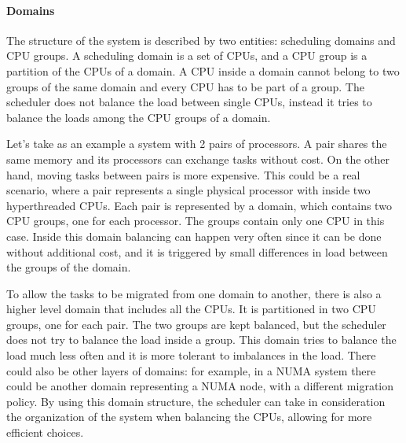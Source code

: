 \paragraph{Domains} %
The structure of the system is described by two entities: scheduling domains and CPU groups. A scheduling domain is a set of CPUs, and a CPU group is a partition of the CPUs of a domain. A CPU inside a domain cannot belong to two groups of the same domain and every CPU has to be part of a group. The scheduler does not balance the load between single CPUs, instead it tries to balance the loads among the CPU groups of a domain.

Let's take as an example a system with 2 pairs of processors. A pair shares the same memory and its processors can exchange tasks without cost. On the other hand, moving tasks between pairs is more expensive. This could be a real scenario, where a pair represents a single physical processor with inside two hyperthreaded CPUs. Each pair is represented by a domain, which contains two CPU groups, one for each processor. The groups contain only one CPU in this case. Inside this domain balancing can happen very often since it can be done without additional cost, and it is triggered by small differences in load between the groups of the domain.

To allow the tasks to be migrated from one domain to another, there is also a higher level domain that includes all the CPUs. It is partitioned in two CPU groups, one for each pair. The two groups are kept balanced, but the scheduler does not try to balance the load inside a group. This domain tries to balance the load much less often and it is more tolerant to imbalances in the load. There could also be other layers of domains: for example, in a NUMA system there could be another domain representing a NUMA node, with a different migration policy. By using this domain structure, the scheduler can take in consideration the organization of the system when balancing the CPUs, allowing for more efficient choices.